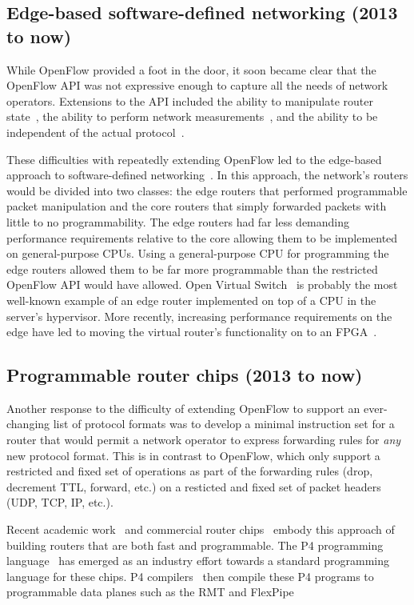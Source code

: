 \subsection{Edge-based software-defined networking (2013 to now)}
While OpenFlow provided a foot in the door, it soon became clear that the
OpenFlow API was not expressive enough to capture all the needs of network
operators. Extensions to the API included the ability to manipulate router
state~\cite{fast}, the ability to perform network
measurements~\cite{opensketch}, and the ability to be independent of the actual
protocol~\cite{pof}.

These difficulties with repeatedly extending OpenFlow led to the edge-based
approach to software-defined networking~\cite{fabric, nsx, openvswitch}. In
this approach, the network's routers would be divided into two classes: the
edge routers that performed programmable packet manipulation and the core
routers that simply forwarded packets with little to no programmability. The
edge routers had far less demanding performance requirements relative to the
core allowing them to be implemented on general-purpose CPUs. Using a
general-purpose CPU for programming the edge routers allowed them to be far
more programmable than the restricted OpenFlow API would have allowed. Open
Virtual Switch~\cite{ovs} is probably the most well-known example of an edge
router implemented on top of a CPU in the server's hypervisor. More recently,
increasing performance requirements on the edge have led to moving the virtual
router's functionality on to an FPGA~\cite{daniel_firestone_nsdi}. 


\subsection{Programmable router chips (2013 to now)}
\label{ss:prog_router_chips}
Another response to the difficulty of extending OpenFlow to support an
ever-changing list of protocol formats was to develop a minimal instruction set
for a router that would permit a network operator to express forwarding rules
for {\em any} new protocol format. This is in contrast to OpenFlow, which only
support a restricted and fixed set of operations as part of the forwarding
rules (drop, decrement TTL, forward, etc.) on a resticted and fixed set of
packet headers (UDP, TCP, IP, etc.).

Recent academic work~\cite{rmt} and commercial router chips~\cite{tofino,
flexpipe, xpliant} embody this approach of building routers that are
both fast and programmable. The P4 programming language~\cite{p4} has emerged
as an industry effort towards a standard programming language for these chips.
P4 compilers~\cite{lavanya_compiler, p4c} then compile these P4 programs to
programmable data planes such as the RMT and FlexPipe~\cite{flexpipe}

